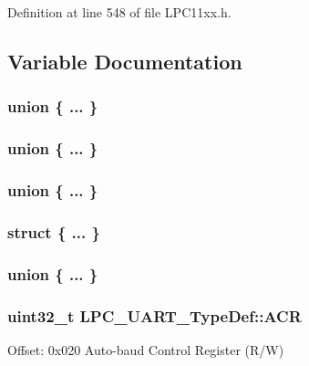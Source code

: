 Definition at line 548 of file L\+P\+C11xx.\+h.



\subsection{Variable Documentation}
\subsubsection[{\texorpdfstring{"@11}{@11}}]{\setlength{\rightskip}{0pt plus 5cm}union \{ ... \} }\hypertarget{group___l_p_c11xx___definitions_ga672c1863d6629c3738c31c8ebd9a3bea}{}\label{group___l_p_c11xx___definitions_ga672c1863d6629c3738c31c8ebd9a3bea}
\subsubsection[{\texorpdfstring{"@13}{@13}}]{\setlength{\rightskip}{0pt plus 5cm}union \{ ... \} }\hypertarget{group___l_p_c11xx___definitions_gac00c51e385e1fedbf1fb1f6175c90196}{}\label{group___l_p_c11xx___definitions_gac00c51e385e1fedbf1fb1f6175c90196}
\subsubsection[{\texorpdfstring{"@5}{@5}}]{\setlength{\rightskip}{0pt plus 5cm}union \{ ... \} }\hypertarget{group___l_p_c11xx___definitions_gad7408cd7a9f7bb7bc4601434addb6cb8}{}\label{group___l_p_c11xx___definitions_gad7408cd7a9f7bb7bc4601434addb6cb8}
\subsubsection[{\texorpdfstring{"@7}{@7}}]{\setlength{\rightskip}{0pt plus 5cm}struct \{ ... \} }\hypertarget{group___l_p_c11xx___definitions_ga430da4aec9c6031240e911cba3c9bcc3}{}\label{group___l_p_c11xx___definitions_ga430da4aec9c6031240e911cba3c9bcc3}
\subsubsection[{\texorpdfstring{"@9}{@9}}]{\setlength{\rightskip}{0pt plus 5cm}union \{ ... \} }\hypertarget{group___l_p_c11xx___definitions_ga00afa7eba702f037c6c4a3b4221115df}{}\label{group___l_p_c11xx___definitions_ga00afa7eba702f037c6c4a3b4221115df}
\subsubsection[{\texorpdfstring{A\+CR}{ACR}}]{ uint32\+\_\+t L\+P\+C\+\_\+\+U\+A\+R\+T\+\_\+\+Type\+Def\+::\+A\+CR}\hypertarget{group___l_p_c11xx___definitions_ga7d5c974d92ad63ce7f5e212a7b4bfcd0}{}\label{group___l_p_c11xx___definitions_ga7d5c974d92ad63ce7f5e212a7b4bfcd0}
Offset\+: 0x020 Auto-\/baud Control Register (R/W) 

